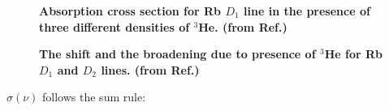 \begin{figure}[t!]
	\centering
	\caption{{\bf Absorption cross section for Rb $D_{1}$ line in the presence of three different densities of $^{3}$He. (from Ref.\@ \cite{Romalis1997})}}
	\label{AbsorptionLine}
\end{figure}

\begin{figure}[t!]
	\centering
	\caption{{\bf The shift and the broadening due to presence of $^{3}$He for Rb $D_{1}$ and $D_{2}$ lines. (from Ref.\@ \cite{Romalis1997})}}
	\label{PressureBroadening}
\end{figure}

$\sigma(\nu)$ follows the sum rule\cite{Merzbacher}:

